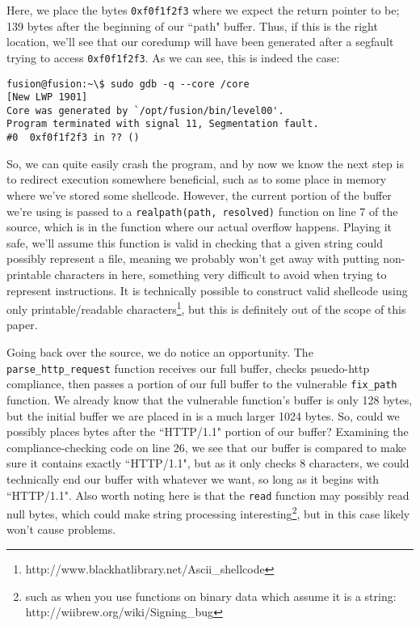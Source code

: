 Here, we place the bytes \texttt{0xf0f1f2f3} where we expect the return pointer to be;
139 bytes after the beginning of our ``path" buffer. Thus, if this
is the right location, we'll see that our coredump will have been
generated after a segfault trying to access \texttt{0xf0f1f2f3}.
As we can see, this is indeed the case:

\begin{lstlisting}
fusion@fusion:~\$ sudo gdb -q --core /core
[New LWP 1901]
Core was generated by `/opt/fusion/bin/level00'.
Program terminated with signal 11, Segmentation fault.
#0  0xf0f1f2f3 in ?? ()
\end{lstlisting}

So, we can quite easily crash the program, and by now we know the
next step is to redirect execution somewhere beneficial, such as
to some place in memory where we've stored some shellcode. However, 
the current portion of the buffer we're using is passed to
a \texttt{realpath(path, resolved)} function on line 7 of 
the source, which is in the function where our actual overflow happens. Playing
it safe, we'll assume this function is valid in checking that a
given string could possibly represent a file, meaning we probably
won't get away with putting non-printable characters in here, 
something very difficult to avoid when trying to represent instructions.
It is technically possible to construct valid shellcode using
only printable/readable characters\footnote{http://www.blackhatlibrary.net/Ascii\_shellcode},
but this is definitely out of the scope of this paper.

Going back over the source, we do notice an opportunity. The
\texttt{parse\_http\_request} function receives our full buffer,
checks psuedo-http compliance, then passes a portion of our
full buffer to the vulnerable \texttt{fix\_path} function. We 
already know that the vulnerable function's buffer is only
128 bytes, but the initial buffer we are placed in is a much
larger 1024 bytes. So, could we possibly places bytes after
the ``HTTP/1.1" portion of our buffer? Examining the compliance-checking
code on line 26, we see that our buffer is compared to make
sure it contains exactly ``HTTP/1.1", but as it only checks
8 characters, we could technically end our buffer with whatever
we want, so long as it begins with ``HTTP/1.1". Also worth noting
here is that the \texttt{read} function may
possibly read null bytes, which could make string processing 
interesting\footnote{such as when you use functions on binary data which assume it is a string: http://wiibrew.org/wiki/Signing\_bug},
but in this case likely won't cause problems.

